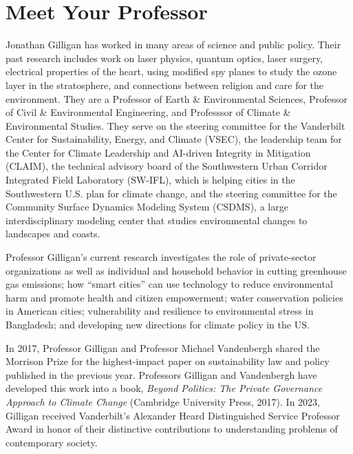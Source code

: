 \clearpage
\section{Meet Your Professor}
Jonathan Gilligan has worked in many areas of science and public policy.
Their past research includes work on laser physics, quantum optics,
laser surgery, electrical properties of the heart, using modified spy planes to
study the ozone layer in the stratosphere, and connections between religion and
care for the environment.
They are a Professor of Earth \& Environmental Sciences,
Professor of Civil \& Environmental Engineering,
and Professsor of Climate \& Environmental Studies.
They serve on the steering committee for the Vanderbilt Center for
Sustainability, Energy, and Climate (VSEC),
the leadership team for the
Center for Climate Leadership and AI-driven Integrity in Mitigation
(CLAIM),
the technical advisory board of the
Southwestern Urban Corridor Integrated Field Laboratory (SW-IFL),
which is helping cities
in the Southwestern U.S. plan for climate change,
and the steering committee for the
Community Surface Dynamics Modeling System (CSDMS),
a large interdisciplinary modeling
center that studies environmental changes to landscapes and coasts.
\iffalse

Professor Gilligan joined the Vanderbilt Faculty in 1994 as a member of the
Department of Physics and Astronomy. In 2003, when the Department of Geology
became the Department of Earth and Environmental Science, Professor Gilligan
joined the new department to focus on atmospheric science, global climate change,
and the interactions of politics, ethics, religion, communication, and the
environment.
\fi

Professor Gilligan's current research investigates the role of private-sector
organizations as well as individual and household behavior in cutting
greenhouse gas emissions;
how ``smart cities'' can use technology to reduce environmental harm and
promote health and citizen empowerment;
water conservation policies in American cities;
vulnerability and resilience to environmental stress in Bangladesh;
and developing new directions for climate policy in the US.

In 2017, Professor Gilligan and Professor Michael Vandenbergh shared
the Morrison Prize for the highest-impact paper on sustainability law and
policy published in the previous year. Professors Gilligan and Vandenbergh
have developed this work into a book,
\emph{Beyond Politics: The Private Governance Approach to Climate Change\/}
(Cambridge University Press, 2017).
In 2023, Gilligan received Vanderbilt's Alexander Heard Distinguished
Service Professor Award in honor of their distinctive contributions to
understanding problems of contemporary society.


